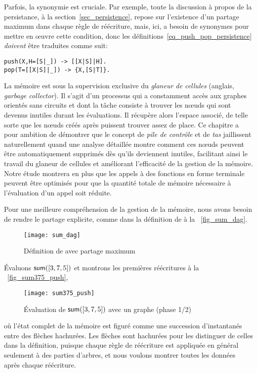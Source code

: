 Parfois, la synonymie est cruciale. Par exemple, toute la discussion à
propos de la persistance, à la section~\ref{sec_persistence}, repose
sur l'existence d'un partage maximum dans chaque règle de réécriture,
mais, ici, \Erlang a besoin de synonymes pour mettre en {\oe}uvre
cette condition, donc les définitions~\eqref{eq_push_pop_persistence}
 \emph{doivent} être traduites comme
suit:
\begin{verbatim}
push(X,H=[S|_]) -> [[X|S]|H].
pop(T=[[X|S]|_]) -> {X,[S|T]}.
\end{verbatim}


La mémoire est sous la supervision exclusive du
\emph{glaneur de cellules} (anglais, \emph{garbage collector}). Il
s'agit d'un processus qui a constamment accès aux graphes orientés
sans circuits et dont la tâche consiste à trouver les n{\oe}uds qui
sont devenus inutiles durant les évaluations. Il récupère alors
l'espace associé, de telle sorte que les n{\oe}uds créés après
puissent trouver assez de place. Ce chapitre a pour ambition de
démontrer que le concept de \emph{pile de contrôle} et de \emph{tas}
jaillissent naturellement quand une analyse détaillée montre comment
ces n{\oe}uds peuvent être automatiquement supprimés dès qu'ils
deviennent inutiles, facilitant ainsi le travail du glaneur de
cellules et améliorant l'efficacité de la gestion de la mémoire. Notre
étude montrera en plus que les appels à des fonctions en forme
terminale peuvent être optimisés pour que la quantité totale de mémoire nécessaire à
l'évaluation d'un appel soit réduite.

Pour une meilleure compréhension de la gestion de la mémoire, nous
avons besoin de rendre le partage explicite, comme dans la définition
de  à la \fig~\vref{fig_sum_dag}.
\begin{figure}
\centering
\texttt{[image: sum\_dag]}%
\caption{Définition de  avec partage maximum
\label{fig_sum_dag}}
\end{figure}
Évaluons \(\textsf{sum}([3,7,5])\) et montrons les premières réécritures
à la \fig~\vref{fig_sum375_push},
\begin{figure}[b]
\centering
\texttt{[image: sum375\_push]}
\caption{Évaluation de \(\textsf{sum}([3,7,5])\) avec un graphe (phase 1/2)
\label{fig_sum375_push}}
\end{figure}
où l'état complet de la mémoire est figuré comme une succession
d'instantanés entre des flèches hachurées.  Les flèches sont hachurées pour les distinguer de celles
dans la définition, puisque chaque règle de réécriture est appliquée
en général seulement à des parties d'arbres, et nous voulons montrer
toutes les données après chaque réécriture.

